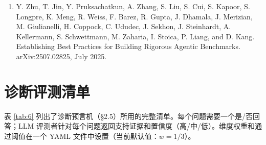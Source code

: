 \documentclass[11pt,UTF8,fontset=fandol]{ctexart}
\begin{document}
\begin{enumerate}[leftmargin=2.2em,labelsep=0.4em,itemsep=0.15em]
\item Y. Zhu, T. Jin, Y. Pruksachatkun, A. Zhang, S. Liu, S. Cui, S. Kapoor, S. Longpre, K. Meng, R. Weiss, F. Barez, R. Gupta, J. Dhamala, J. Merizian, M. Giulianelli, H. Coppock, C. Ududec, J. Sekhon, J. Steinhardt, A. Kellermann, S. Schwettmann, M. Zaharia, I. Stoica, P. Liang, and D. Kang. Establishing Best Practices for Building Rigorous Agentic Benchmarks. arXiv:2507.02825, July 2025.
\end{enumerate}

\appendix

\section{诊断评测清单}

表 \ref{tab:6} 列出了诊断预言机（§2.5）所用的完整清单。每个问题需要一个是/否回答；LLM 评测者针对每个问题返回支持证据和置信度（高/中/低）。维度权重和通过阈值在一个 YAML 文件中设置（当前默认值：$w = 1/3$）。
\end{document}
